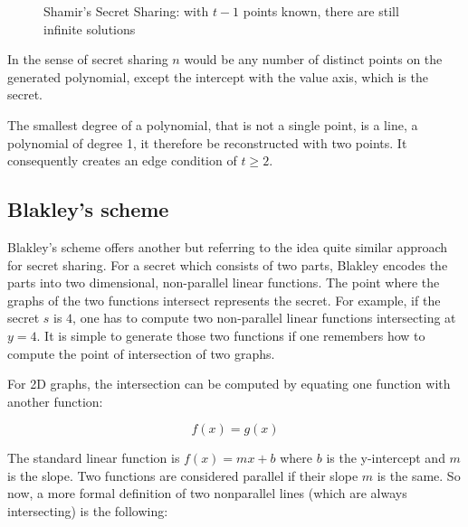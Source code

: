 \begin{figure}
  \centering
  \caption{Shamir's Secret Sharing: with $t-1$ points known, there are still infinite solutions}
\end{figure}

In the sense of secret sharing $n$ would be any number of distinct points on
the generated polynomial, except the intercept with the value axis, which is
the secret.

The smallest degree of a polynomial, that is not a single point, is a line, a
polynomial of degree 1, it therefore be reconstructed with two points. It
consequently creates an edge condition of $t \geq 2$.
\cite{how_to_share_a_secret}

\subsection{Blakley's scheme}

Blakley's scheme offers another but referring to the idea quite similar
approach for secret sharing. For a secret which consists of two parts, 
Blakley encodes the parts into two dimensional, non-parallel linear functions.
The point where the graphs of the two functions intersect represents the
secret. For example, if the secret $s$ is $4$, one has to compute two non-parallel
linear functions intersecting at $y = 4$. It is simple to generate those two
functions if one remembers how to compute the point of intersection of two graphs.

For 2D graphs, the intersection can be computed by equating one function with
another function:

$$f(x) = g(x)$$

The standard linear function is $f(x) = mx + b$ where $b$ is the y-intercept and
$m$ is the slope. Two functions are considered parallel if their slope $m$ is 
the same. So now, a more formal definition of two nonparallel lines (which are
always intersecting) is the following:

